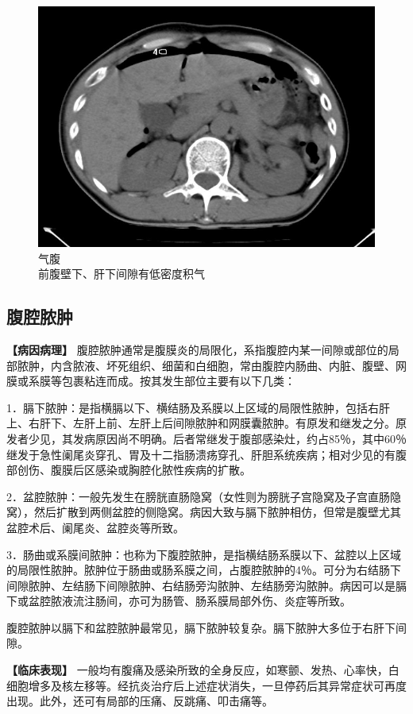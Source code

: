 \begin{figure}[!htbp]
 \centering
 \includegraphics[width=.7\textwidth,height=\textheight,keepaspectratio]{./images/Image00372.jpg}
 \captionsetup{justification=centering}
 \caption{气腹\\{\small 前腹壁下、肝下间隙有低密度积气}}
 \label{fig18-3}
  \end{figure} 

\subsection{腹腔脓肿}

\textbf{【病因病理】}
腹腔脓肿通常是腹膜炎的局限化，系指腹腔内某一间隙或部位的局部脓肿，内含脓液、坏死组织、细菌和白细胞，常由腹腔内肠曲、内脏、腹壁、网膜或系膜等包裹粘连而成。按其发生部位主要有以下几类：

1．膈下脓肿：是指横膈以下、横结肠及系膜以上区域的局限性脓肿，包括右肝上、右肝下、左肝上前、左肝上后间隙脓肿和网膜囊脓肿。有原发和继发之分。原发者少见，其发病原因尚不明确。后者常继发于腹部感染灶，约占85％，其中60％继发于急性阑尾炎穿孔、胃及十二指肠溃疡穿孔、肝胆系统疾病；相对少见的有腹部创伤、腹膜后区感染或胸腔化脓性疾病的扩散。

2．盆腔脓肿：一般先发生在膀胱直肠隐窝（女性则为膀胱子宫隐窝及子宫直肠隐窝），然后扩散到两侧盆腔的侧隐窝。病因大致与膈下脓肿相仿，但常是腹壁尤其盆腔术后、阑尾炎、盆腔炎等所致。

3．肠曲或系膜间脓肿：也称为下腹腔脓肿，是指横结肠系膜以下、盆腔以上区域的局限性脓肿。脓肿位于肠曲或肠系膜之间，占腹腔脓肿的4％。可分为右结肠下间隙脓肿、左结肠下间隙脓肿、右结肠旁沟脓肿、左结肠旁沟脓肿。病因可以是膈下或盆腔脓液流注肠间，亦可为肠管、肠系膜局部外伤、炎症等所致。

腹腔脓肿以膈下和盆腔脓肿最常见，膈下脓肿较复杂。膈下脓肿大多位于右肝下间隙。

\textbf{【临床表现】}
一般均有腹痛及感染所致的全身反应，如寒颤、发热、心率快，白细胞增多及核左移等。经抗炎治疗后上述症状消失，一旦停药后其异常症状可再度出现。此外，还可有局部的压痛、反跳痛、叩击痛等。

